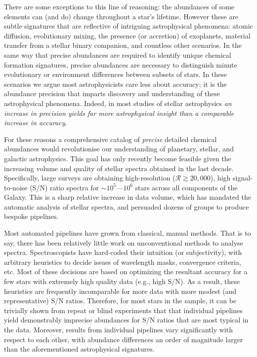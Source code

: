 \documentclass[12pt,preprint]{aastex}
\begin{document}
There are some exceptions to this line of reasoning: the abundances of some
elements can (and do) change throughout a star's lifetime.  However these are
subtle signatures that are reflective of intriguing astrophysical phenomena:
atomic diffusion, evolutionary mixing, the presence (or accretion) of 
exoplanets, material transfer from a stellar binary companion, and countless
other scenarios.  In the same way that precise abundances are required to 
identify unique chemical formation signatures, precise abundances are necessary
to distinguish minute evolutionary or environment differences between subsets of
stars.  In these scenarios we argue most astrophysicists care less about
accuracy; it is the abundance precision that imparts discovery and understanding
of these astrophysical phenomena.  Indeed, in most studies of stellar
astrophysics \textit{an increase in precision yields far more astrophysical 
insight than a comparable increase in accuracy}.


For these reasons a comprehensive catalog of \textit{precise} detailed chemical
abundances would revolutionise our understanding of planetary, stellar, and 
galactic astrophysics.  This goal has only recently become feasible given the 
increasing volume and quality of stellar spectra obtained in the last decade.  
Specifically, large surveys are obtaining high-resolution 
($\mathcal{R} \gtrsim 20,000$), high signal-to-noise (S/N) ratio spectra for
$\sim10^{5}$---$10^{6}$ stars across all components of the Galaxy.  This is a
sharp relative increase in data volume, which has mandated the automatic
analysis of stellar spectra, and persuaded dozens of groups to produce bespoke
pipelines.



Most automated pipelines have grown from classical, manual methods.  That is to
say, there has been relatively little work on unconventional methods to analyse
spectra.  Spectroscopists have hard-coded their intuition (or subjectivity),
with arbitrary heuristics to decide issues of wavelength masks, convergence
criteria, etc.  Most of these decisions are based on optimizing the resultant
accuracy for a few stars with extremely high quality data (e.g., high S/N).  As
a result, these heuristics are frequently incomparable for more data with more
modest (and representative) S/N ratios.  Therefore, for most stars in the sample,
it can be trivially shown from repeat or blind experiments that that individual
pipelines yield demonstrably imprecise abundances for S/N ratios that are 
most typical in the data.  Moreover, results from individual pipelines vary 
significantly with respect to each other, with abundance differences an order
of magnitude larger than the aforementioned astrophysical signatures.
\end{document}
